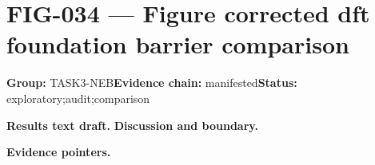 \clearpage
\section{FIG-034 --- Figure corrected dft foundation barrier comparison}
\label{figpage:fig-034}
\textbf{Group:} TASK3-NEB\quad \textbf{Evidence chain:} manifested\quad \textbf{Status:} exploratory;audit;comparison

\textbf{Results text draft.} 
\textbf{Discussion and boundary.} 


\textbf{Evidence pointers.}



\vfill
